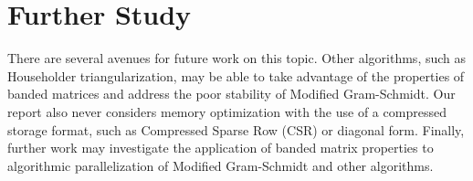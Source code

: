 \documentclass{article}
\numberwithin{pic}{section}
\numberwithin{lem}{section}
\numberwithin{thm}{section}
\numberwithin{cor}{section}
\theoremstyle{definition}
\numberwithin{ex}{section}
\numberwithin{defn}{section}
\theoremstyle{definition}
\theoremstyle{remark}
\newlength\tindent
\renewcommand{\indent}{\hspace*{\tindent}}
\begin{document}
\section{Further Study}
\indent There are several avenues for future work on this topic. Other algorithms, such as Householder triangularization, may be able to take advantage of the properties of banded matrices and address the poor stability of Modified Gram-Schmidt. Our report also never considers memory optimization with the use of a compressed storage format, such as Compressed Sparse Row (CSR) or diagonal form. Finally, further work may investigate the application of banded matrix properties to algorithmic parallelization of Modified Gram-Schmidt and other algorithms.
	
	
\end{document}
